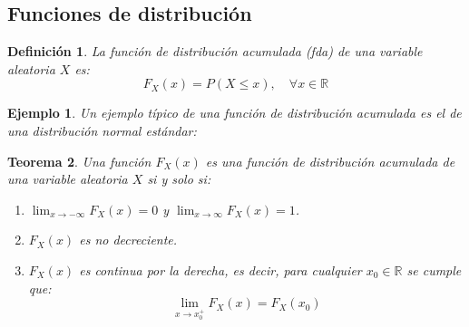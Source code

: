 \documentclass[14pt]{extarticle}
\newtheorem{theorem}{Teorema}[section]
\newtheorem{definition}[theorem]{Definición}
\newtheorem{example}{Ejemplo}[section]
\begin{document}
\subsection{Funciones de distribución}
\begin{definition}
    La función de distribución acumulada (fda) de una variable aleatoria $X$ es:
    \[
        F_X(x) = P(X \leq x), \quad \forall x \in \mathbb{R}
    \]
    
\end{definition}

\begin{example}
    Un ejemplo típico de una función de distribución acumulada es el de una distribución normal estándar:
    \begin{center}
    \end{center}
\end{example}

\begin{theorem}
    Una función $F_X(x)$ es una función de distribución acumulada de una variable aleatoria $X$ si y solo si:
    \begin{enumerate}
        \item $\lim_{x \to -\infty} F_X(x) = 0$ y $\lim_{x \to \infty} F_X(x) = 1$.
        \item $F_X(x)$ es no decreciente.
        \item $F_X(x)$ es continua por la derecha, es decir, para cualquier $x_0 \in \mathbb{R}$ se cumple que:
        \[
            \lim_{x \to x_0^+} F_X(x) = F_X(x_0)
        \]
        
    \end{enumerate}
\end{theorem}
\end{document}
